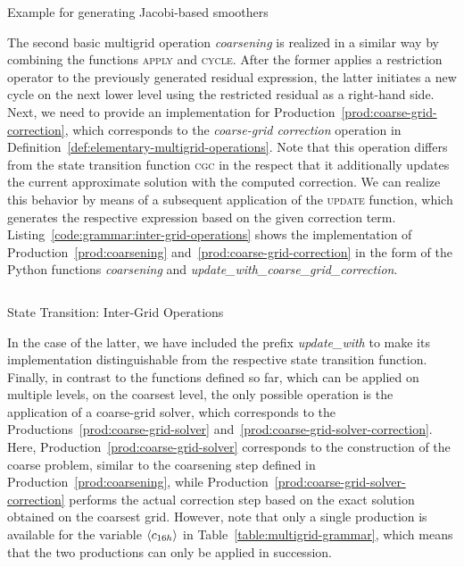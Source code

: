 \begin{listing}
	\inputminted{python}{evostencils/grammar/jacobi.py}
	\caption{Example for generating Jacobi-based smoothers}
	\label{code:grammar:jacobi}
\end{listing}
The second basic multigrid operation \emph{coarsening} is realized in a similar way by combining the functions \textsc{apply} and \textsc{cycle}.
After the former applies a restriction operator to the previously generated residual expression, the latter initiates a new cycle on the next lower level using the restricted residual as a right-hand side.
Next, we need to provide an implementation for Production~\ref{prod:coarse-grid-correction}, which corresponds to the \emph{coarse-grid correction} operation in Definition~\ref{def:elementary-multigrid-operations}.
Note that this operation differs from the state transition function \textsc{cgc} in the respect that it additionally updates the current approximate solution with the computed correction.
We can realize this behavior by means of a subsequent application of the \textsc{update} function, which generates the respective expression based on the given correction term.
Listing~\ref{code:grammar:inter-grid-operations} shows the implementation of Production~\ref{prod:coarsening} and~\ref{prod:coarse-grid-correction} in the form of the Python functions \textsl{coarsening} and \emph{update\_with\_coarse\_grid\_correction}.
\begin{listing}
	\inputminted{python}{evostencils/grammar/inter_grid_operations.py}
	\caption{State Transition: Inter-Grid Operations}
	\label{code:grammar:inter-grid-operations}
\end{listing}
In the case of the latter, we have included the prefix \emph{update\_with} to make its implementation distinguishable from the respective state transition function.
Finally, in contrast to the functions defined so far, which can be applied on multiple levels, on the coarsest level, the only possible operation is the application of a coarse-grid solver, which corresponds to the Productions~\ref{prod:coarse-grid-solver} and~\ref{prod:coarse-grid-solver-correction}.
Here, Production~\ref{prod:coarse-grid-solver} corresponds to the construction of the coarse problem, similar to the coarsening step defined in Production~\ref{prod:coarsening}, while Production~\ref{prod:coarse-grid-solver-correction} performs the actual correction step based on the exact solution obtained on the coarsest grid. 
However, note that only a single production is available for the variable $\langle c_{16h} \rangle$ in Table~\ref{table:multigrid-grammar}, which means that the two productions can only be applied in succession.
